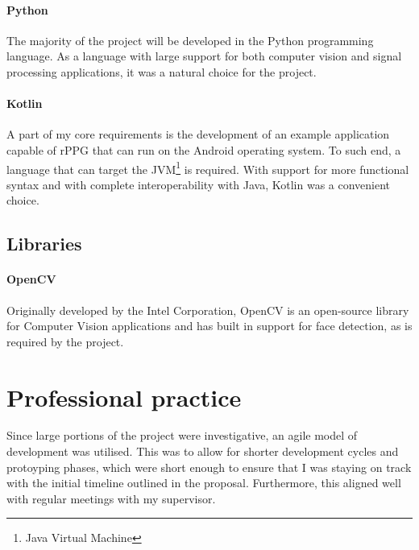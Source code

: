 \paragraph{Python}
The majority of the project will be developed in the Python\cite{Python} programming language. As a language with large support for both computer vision and signal processing applications, it
was a natural choice for the project. 

\paragraph{Kotlin}
A part of my core requirements is the development of an example application capable of rPPG that can run on the Android operating system. 
To such end, a language that can target the JVM\footnote{Java Virtual Machine} is required. 
With support for more functional syntax and with complete interoperability with Java, Kotlin\cite{Kotlin} was a convenient choice.

\subsection{Libraries}
\label{section:libraries}
\paragraph{OpenCV} 
Originally developed by the Intel Corporation, OpenCV\cite{OpenCV} is an open-source library for Computer Vision applications and has built in support for face detection, as is required by the project.


\section{Professional practice}
Since large portions of the project were investigative, an agile model of development was utilised. 
This was to allow for shorter development cycles and protoyping phases, which were short enough to ensure that I was staying on track with the 
initial timeline outlined in the proposal. Furthermore, this aligned well with regular meetings with my supervisor.

